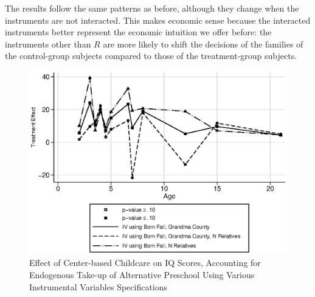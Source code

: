 \noindent The results follow the same patterns as before, although they change when the instruments are not interacted. This makes economic sense because the interacted instruments better represent the economic intuition we offer before: the instruments other than $R$ are more likely to shift the decisions of the families of the control-group subjects compared to those of the treatment-group subjects.

\begin{figure}[H]
		\caption{Effect of Center-based Childcare on IQ Scores, Accounting for Endogenous Take-up of Alternative Preschool Using Various Instrumental Variables Specifications} \label{fig:nointer_Q_iv}
		\includegraphics[width=.7\columnwidth]{output/appendixplots/nointer_Q_iv_te.eps}
\end{figure}

